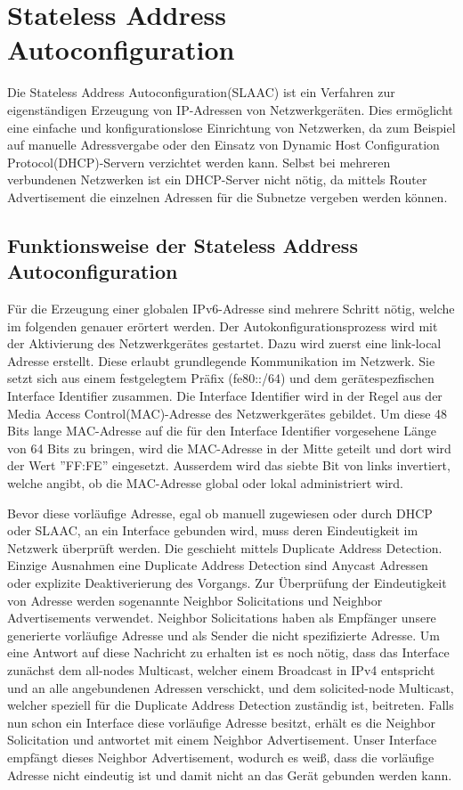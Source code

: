 \documentclass[a4paper, 12pt]{scrartcl}
\begin{document}
\newpage

\section{Stateless Address Autoconfiguration}
Die Stateless Address Autoconfiguration(SLAAC) ist ein Verfahren zur eigenständigen Erzeugung von IP-Adressen von Netzwerkgeräten.
Dies ermöglicht eine einfache und konfigurationslose Einrichtung von Netzwerken, da zum Beispiel auf manuelle Adressvergabe oder den Einsatz von Dynamic Host Configuration Protocol(DHCP)-Servern verzichtet werden kann.
Selbst bei mehreren verbundenen Netzwerken ist ein DHCP-Server nicht nötig, da mittels Router Advertisement die einzelnen Adressen für die Subnetze vergeben werden können.


\subsection{Funktionsweise der Stateless Address Autoconfiguration}
Für die Erzeugung einer globalen IPv6-Adresse sind mehrere Schritt nötig, welche im folgenden genauer erörtert werden.
Der Autokonfigurationsprozess wird mit der Aktivierung des Netzwerkgerätes gestartet.
Dazu wird zuerst eine link-local Adresse erstellt. Diese erlaubt grundlegende Kommunikation im Netzwerk.
Sie  setzt sich aus einem festgelegtem Präfix (fe80::/64) und dem gerätespezfischen Interface Identifier zusammen.
Die Interface Identifier wird in der Regel aus der Media Access Control(MAC)-Adresse des Netzwerkgerätes gebildet.
Um diese 48 Bits lange MAC-Adresse auf die für den Interface Identifier vorgesehene Länge von 64 Bits zu bringen, wird die MAC-Adresse in der Mitte geteilt und dort wird der Wert ''FF:FE'' eingesetzt. Ausserdem wird das siebte Bit von links invertiert, welche angibt, ob die MAC-Adresse global oder lokal administriert wird.

Bevor diese vorläufige Adresse, egal ob manuell zugewiesen oder durch DHCP oder SLAAC, an ein Interface gebunden wird, muss deren Eindeutigkeit im Netzwerk überprüft werden. Die geschieht mittels Duplicate Address Detection.
Einzige Ausnahmen eine Duplicate Address Detection sind Anycast Adressen oder explizite Deaktiverierung des Vorgangs.
Zur Überprüfung der Eindeutigkeit von Adresse werden sogenannte Neighbor Solicitations und Neighbor Advertisements verwendet. Neighbor Solicitations haben als Empfänger unsere generierte vorläufige Adresse und als Sender die nicht spezifizierte Adresse.
Um eine Antwort auf diese Nachricht zu erhalten ist es noch nötig, dass das Interface zunächst dem all-nodes Multicast, welcher einem Broadcast in IPv4 entspricht und an alle angebundenen Adressen verschickt, und dem solicited-node Multicast, welcher speziell für die Duplicate Address Detection zuständig ist, beitreten.
Falls nun schon ein Interface diese vorläufige Adresse besitzt, erhält es die Neighbor Solicitation und antwortet mit einem Neighbor Advertisement. 
Unser Interface empfängt dieses Neighbor Advertisement, wodurch es weiß, dass die vorläufige Adresse nicht eindeutig ist und damit nicht an das Gerät gebunden werden kann.
\end{document}
